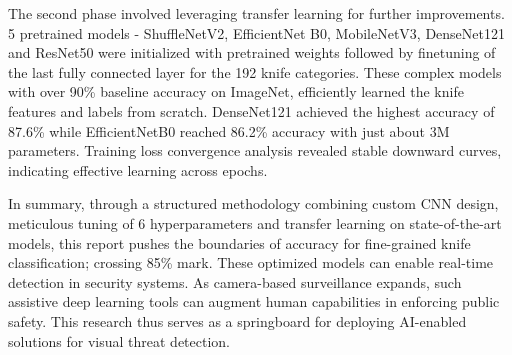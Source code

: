 \documentclass[10pt,twocolumn,letterpaper]{article}
\begin{document}
The second phase involved leveraging transfer learning for further improvements. 5 pretrained models - ShuffleNetV2, EfficientNet B0, MobileNetV3, DenseNet121 and ResNet50 were initialized with pretrained weights followed by finetuning of the last fully connected layer for the 192 knife categories. These complex models with over 90\% baseline accuracy on ImageNet, efficiently learned the knife features and labels from scratch. DenseNet121 achieved the highest accuracy of 87.6\% while EfficientNetB0 reached 86.2\% accuracy with just about 3M parameters. Training loss convergence analysis revealed stable downward curves, indicating effective learning across epochs.

In summary, through a structured methodology combining custom CNN design, meticulous tuning of 6 hyperparameters and transfer learning on state-of-the-art models, this report pushes the boundaries of accuracy for fine-grained knife classification; crossing 85\% mark. These optimized models can enable real-time detection in security systems. As camera-based surveillance expands, such assistive deep learning tools can augment human capabilities in enforcing public safety. This research thus serves as a springboard for deploying AI-enabled solutions for visual threat detection.

{\small
  
  
}
\end{document}
